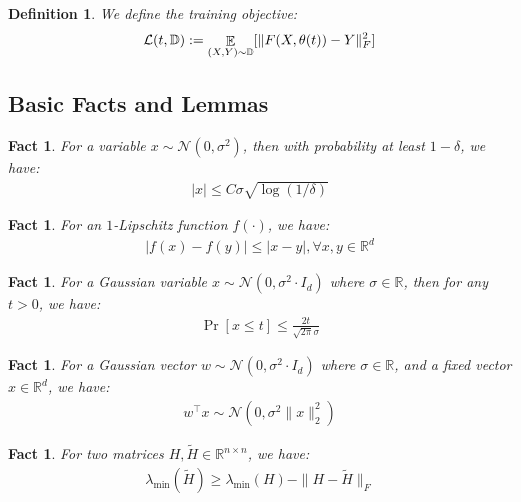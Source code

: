 \documentclass[11pt]{article}
\theoremstyle{plain}
\newtheorem{definition}[theorem]{Definition}
\newtheorem{fact}[theorem]{Fact}
\newcommand{\wt}{\widetilde}
\newcommand{\R}{\mathbb{R}}
\DeclareMathOperator*{\E}{{\mathbb{E}}}
\begin{document}
\begin{definition}
    We define the training objective:
    \begin{align*}
        {\cal L}(t, \mathbb{D}) := \E_{(X, Y) \sim \mathbb{D}}[ \|F(X, \theta(t)) - Y \|_F^2 ]
    \end{align*}
\end{definition}

\subsection{Basic Facts and Lemmas}
\begin{fact}\label{fac:gaussian_tail}
    For a variable $x \sim \mathcal{N}(0, \sigma^2)$, then with probability at least $1 - \delta$, we have:
    \begin{align*}
        |x| \leq C \sigma \sqrt{\log(1/\delta)}
    \end{align*}
\end{fact}


\begin{fact}\label{fac:lipschitz_1}
    For an $1$-Lipschitz function $f(\cdot)$, we have:
    \begin{align*}
        | f(x) - f(y) | \leq | x - y |, \forall x, y \in \R^d
    \end{align*}
\end{fact}

\begin{fact}\label{fac:anti_concen_gaussian}
    For a Gaussian variable $x \sim \mathcal{N}(0, \sigma^2 \cdot I_d )$ where $\sigma \in \R$, then for any $t > 0$, we have:
    \begin{align*}
        \Pr[x \leq t] \leq \frac{2t}{\sqrt{2\pi} \sigma }
    \end{align*}
\end{fact}

\begin{fact}\label{fac:inner_product_gaussian}
    For a Gaussian vector $w \sim \mathcal{N}(0, \sigma^2 \cdot I_d )$ where $\sigma \in \R$, and a fixed vector $x \in \R^d$, we have:
    \begin{align*}
        w^\top x \sim \mathcal{N}(0, \sigma^2 \|x\|_2^2  )
    \end{align*}
\end{fact}

\begin{fact}\label{fac:lambda_min_perturb}
    For two matrices $H, \wt{H} \in \R^{n \times n}$, we have:
    \begin{align*}
        \lambda_{\min}( \wt{H} ) \ge \lambda_{\min} ( H ) - \| H - \wt{H} \|_F
    \end{align*}
\end{fact}
\end{document}
